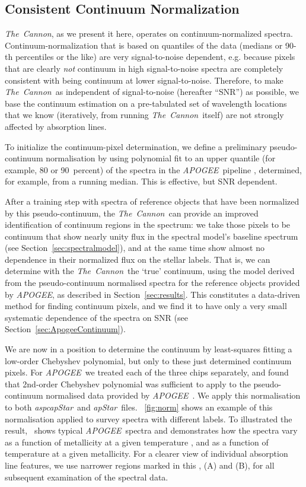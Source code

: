 \documentclass[12pt, preprint]{aastex}
\newcommand{\sectionname}{Section}
\newcommand{\tc}{\textsl{The~Cannon}}
\newcommand{\apogee}{\textsl{APOGEE}}
\newcommand{\aspcapstar}{\textsl{aspcapStar}}
\newcommand{\apstar}{\textsl{apStar}}
\begin{document}
\subsection{Consistent Continuum Normalization}\label{sec:ContNorm}

\tc, as we present it here, operates on continuum-normalized spectra.
Continuum-normalization that is based on quantiles of the data (medians or 90-th percentiles or the like)
are very signal-to-noise dependent, e.g. because pixels that are clearly \emph{not} continuum in high signal-to-noise
spectra are completely consistent with being continuum at lower signal-to-noise.
Therefore, to make \tc\ as independent of signal-to-noise (hereafter ``SNR'') as possible,
we base the continuum estimation on a pre-tabulated set of wavelength locations that we know
(iteratively, from running \tc\ itself) are not strongly affected by absorption lines.

To initialize the continuum-pixel determination,
we define a preliminary pseudo-continuum normalisation by 
using polynomial fit to an upper quantile (for example, 80 or 90~percent) of the spectra
 in the \apogee\ pipeline \citep{Meszaros2013}, determined, for example, from a running median.
  This is effective, but SNR dependent.
  
After a training step with spectra of reference objects that have been  normalized  by this pseudo-continuum,
the \tc\ can provide an improved identification of continuum regions in the spectrum: 
we take those pixels to be continuum that show nearly unity flux in the spectral model's baseline spectrum (see \sectionname~\ref{sec:spectralmodel}), and at the same time show almost no dependence in their normalized flux on the stellar labels.
That is, we can determine with the \tc\ the `true' continuum, using the model derived from the pseudo-continuum normalised spectra for the reference objects provided by \apogee, as described in \sectionname~\ref{sec:results}. This constitutes a data-driven method for finding continuum pixels, and we find it to have only a very small systematic dependence of the spectra on SNR (see \sectionname~\ref{sec:ApogeeContinuum}).

We are now in a position to determine the continuum by least-squares fitting a low-order Chebyshev polynomial, but only to these just determined continuum pixels.
For \apogee\ we treated each of the three chips separately, and found that 2nd-order Chebyshev polynomial was sufficient to apply to the pseudo-continuum normalised data provided by \apogee\ . We apply this normalisation to both \aspcapstar\ and \apstar\ files.
\figurename~\ref{fig:norm} shows an example of this normalisation applied to survey spectra with different labels.
To illustrated the result, \figurename\ shows typical \apogee\ spectra and demonstrates how the spectra 
vary as a function of metallicity at a given temperature , and as a function of temperature at a given metallicity. 
For a clearer view of individual absorption line features, we use narrower regions marked in this \figurename, (A) and (B), for all subsequent examination of the spectral data. 
\end{document}
